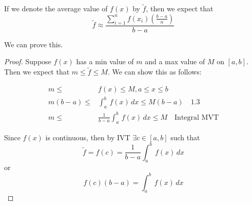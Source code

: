 \documentclass[11pt]{article}
\theoremstyle{plain}
\theoremstyle{remark}
\theoremstyle{plain}
\begin{document}
If we denote the average value of $f(x)$ by $\tilde{f}$, then we expect that \[\tilde{f} \approx \frac{\sum_{i=1}^nf(x_i)(\frac{b-a}{n})}{b-a}\]

We can prove this. 

\begin{proof}
    Suppose $f(x)$ has a min value of $m$ and a max value of $M$ on $[a,b]$. Then we expect that $m\leq \tilde{f}\leq M$. We can show this as follows:

    \begin{align*}
        m \leq &f(x) \leq M, a \leq x \leq b \\
        m(b-a)\leq &\int_a^b\,f(x)\,dx\leq M(b-a) \quad \text{1.3}\\
        m\leq &\frac{1}{b-a}\int_a^b\,f(x)\,dx\leq M \quad \text{Integral MVT}
    \end{align*}

    Since $f(x)$ is continuous, then by IVT $\exists c \in [a,b]$ such that \[\tilde{f} = f(c) = \frac{1}{b-a}\int_a^b\,f(x)\,dx\] or \[ f(c)(b-a) = \int_a^b\,f(x)\,dx\]
\end{proof}
\end{document}
